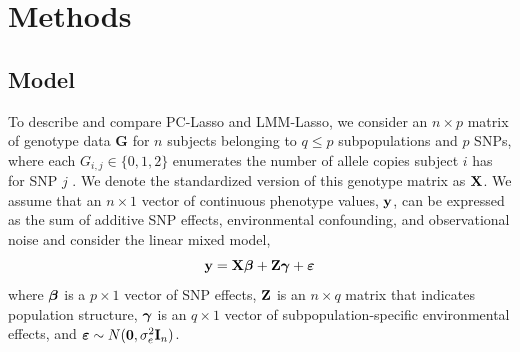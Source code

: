 \section{Methods} \label{sec:methods}



\subsection{Model}


To describe and compare PC-Lasso and LMM-Lasso, we consider an $n \times p$ matrix of genotype data $\boldsymbol{G}$ for $n$ subjects belonging to $q \le p$ subpopulations and $p$ SNPs, where each $G_{i,j} \in \{ 0, 1, 2 \}$ enumerates the number of allele copies subject $i$ has for SNP $j$  . We denote the standardized version   of this genotype matrix as $\textbf{X}$. We assume that an $n \times 1$ vector of continuous phenotype values, $\textbf{y}$, can be expressed as the sum of additive SNP effects, environmental confounding, and observational noise and consider the linear mixed model,
\begin{equation}
    \label{eqn:model}
    \textbf{y} = \textbf{X}\boldsymbol{\beta} + \textbf{Z}\boldsymbol{\gamma} + \boldsymbol{\varepsilon}
\end{equation}
where $\boldsymbol{\beta}$ is a $p \times 1$ vector of SNP effects, $\textbf{Z}$ is an $n \times q$ matrix that indicates population structure, $\boldsymbol{\gamma}$ is an $q \times 1$ vector of subpopulation-specific environmental effects, and $\boldsymbol{\varepsilon} \sim N(\boldsymbol{0}, \sigma^2_e \textbf{I}_n)$.

